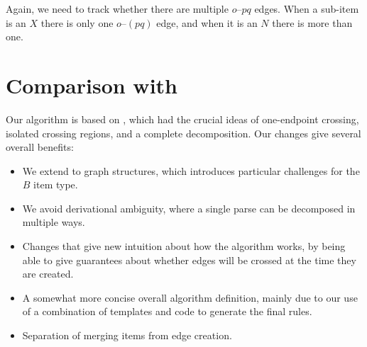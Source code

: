 \noindent
\begin{minipage}{\deductionRuleLength}
\centering
\hfill{}\hfill
{}
\end{minipage}
\vspace{5mm}

Again, we need to track whether there are multiple $o$--$pq$ edges.
When a sub-item is an $X$ there is only one $o$--$(pq)$ edge, and when it is an $N$ there is more than one.

\section{Comparison with \textcite{ec}} \label{sec:ec-comparison}

Our algorithm is based on \textcite{ec}, which had the crucial ideas of one-endpoint crossing, isolated crossing regions, and a complete decomposition.
Our changes give several overall benefits:

\begin{itemize}
  \item We extend to graph structures, which introduces particular challenges for the $B$ item type.
  \item We avoid derivational ambiguity, where a single parse can be decomposed in multiple ways.
  \item Changes that give new intuition about how the algorithm works, by being able to give guarantees about whether edges will be crossed at the time they are created.
  \item A somewhat more concise overall algorithm definition, mainly due to our use of a combination of templates and code to generate the final rules.
  \item Separation of merging items from edge creation.
\end{itemize}


